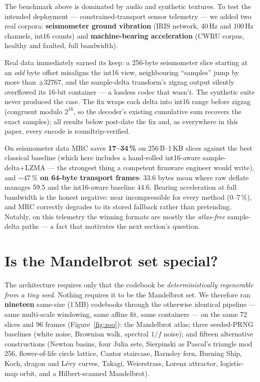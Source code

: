 \documentclass[11pt,a4paper]{article}
\begin{document}
The benchmark above is dominated by audio and synthetic textures. To test the
intended deployment --- constrained-transport sensor telemetry --- we added two
real corpora: \textbf{seismometer ground vibration} (IRIS network, 40\,Hz and
100\,Hz channels, int16 counts) and \textbf{machine-bearing acceleration}
(CWRU corpus, healthy and faulted, full bandwidth).

Real data immediately earned its keep: a 256-byte seismometer slice starting at
an \emph{odd} byte offset misaligns the int16 view, neighbouring ``samples''
jump by more than $\pm 32767$, and the sample-delta transform's zigzag output
silently overflowed its 16-bit container --- a lossless codec that wasn't. The
synthetic suite never produced the case. The fix wraps each delta into int16
range before zigzag (congruent modulo $2^{16}$, so the decoder's existing
cumulative sum recovers the exact samples); all results below post-date the fix
and, as everywhere in this paper, every encode is roundtrip-verified.

On seismometer data MRC saves \textbf{17--34\,\%} on 256\,B--1\,KB slices
against the best classical baseline (which here includes a hand-rolled
int16-aware sample-delta+LZMA --- the strongest thing a competent firmware
engineer would write), and \textbf{${\sim}47\,\%$ on 64-byte transport frames}:
33.6 bytes mean where raw deflate manages 59.5 and the int16-aware baseline
44.6. Bearing acceleration at full bandwidth is the honest negative: near
incompressible for every method (0--7\,\%), and MRC correctly degrades to its
stored fallback rather than pretending. Notably, on this telemetry the winning
formats are mostly the \emph{atlas-free} sample-delta paths --- a fact that
motivates the next section's question.

\section{Is the Mandelbrot set special?}
\label{sec:zoo}

The architecture requires only that the codebook be \emph{deterministically
regenerable from a tiny seed}. Nothing requires it to be the Mandelbrot set.
We therefore ran \textbf{nineteen} same-size (1\,MB) codebooks through the
otherwise identical pipeline --- same multi-scale windowing, same affine fit,
same containers --- on the same 72 slices and 96 frames
(Figure~\ref{fig:zoo}): the Mandelbrot atlas; three seeded-PRNG baselines
(white noise, Brownian walk, spectral $1/f$ noise); and fifteen alternative
constructions (Newton basins, four Julia sets, Sierpinski as Pascal's triangle
mod 256, flower-of-life circle lattice, Cantor staircase, Barnsley fern,
Burning Ship, Koch, dragon and L\'evy curves, Takagi, Weierstrass, Lorenz
attractor, logistic-map orbit, and a Hilbert-scanned Mandelbrot).
\end{document}
